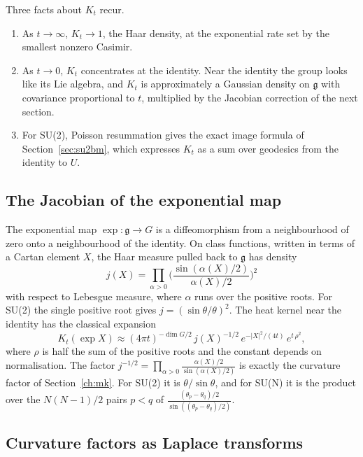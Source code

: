 Three facts about $K_t$ recur.
\begin{enumerate}
\item[(i)] As $t\to\infty$, $K_t\to1$, the Haar density, at the exponential rate set by the smallest nonzero Casimir.
\item[(ii)] As $t\to0$, $K_t$ concentrates at the identity. Near the identity the group looks like its Lie algebra, and $K_t$ is approximately a Gaussian density on $\mathfrak g$ with covariance proportional to $t$, multiplied by the Jacobian correction of the next section.
\item[(iii)] For SU(2), Poisson resummation gives the exact image formula of Section~\ref{sec:su2bm}, which expresses $K_t$ as a sum over geodesics from the identity to $U$.
\end{enumerate}

\subsection{The Jacobian of the exponential map}\label{sec:jacobian}

The exponential map $\exp:\mathfrak g\to G$ is a diffeomorphism from a neighbourhood of zero onto a neighbourhood of the identity. On class functions, written in terms of a Cartan element $X$, the Haar measure pulled back to $\mathfrak g$ has density
\[
j(X)=\prod_{\alpha>0}\Big(\frac{\sin(\alpha(X)/2)}{\alpha(X)/2}\Big)^2
\]
with respect to Lebesgue measure, where $\alpha$ runs over the positive roots. For SU(2) the single positive root gives $j=(\sin\theta/\theta)^2$. The heat kernel near the identity has the classical expansion
\[
K_t(\exp X)\approx(4\pi t)^{-\dim G/2}\,j(X)^{-1/2}\,e^{-|X|^2/(4t)}\,e^{t\,\rho^2},
\]
where $\rho$ is half the sum of the positive roots and the constant depends on normalisation. The factor $j^{-1/2}=\prod_{\alpha>0}\frac{\alpha(X)/2}{\sin(\alpha(X)/2)}$ is exactly the curvature factor of Section~\ref{ch:mk}. For SU(2) it is $\theta/\sin\theta$, and for SU(N) it is the product over the $N(N-1)/2$ pairs $p<q$ of $\frac{(\theta_p-\theta_q)/2}{\sin((\theta_p-\theta_q)/2)}$.

\subsection{Curvature factors as Laplace transforms}\label{sec:curvature}

